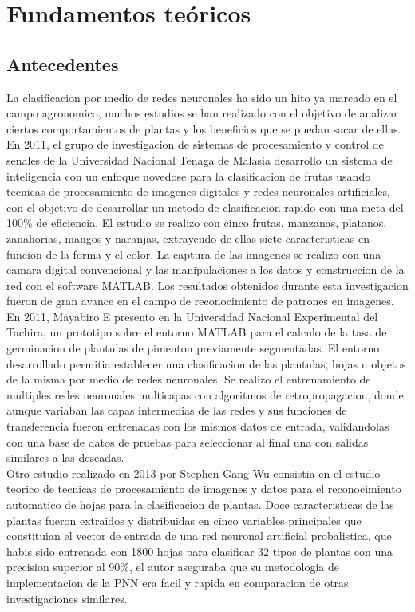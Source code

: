 \chapter{Fundamentos te\'oricos}

\section{Antecedentes}

La clasificacion por medio de redes neuronales ha sido un hito ya marcado en el campo agronomico, muchos estudios se han realizado con el objetivo de analizar ciertos comportamientos de plantas y los beneficios que se puedan sacar de ellas. En 2011, el grupo de investigacion de sistemas de procesamiento y control de senales de la Universidad Nacional Tenaga de Malasia desarrollo un sistema de inteligencia con un enfoque novedose para la clasificacion de frutas usando tecnicas de procesamiento de imagenes digitales y redes neuronales artificiales, con el objetivo de desarrollar un metodo de clasificacion rapido con una meta del 100\% de eficiencia. El estudio se realizo con cinco frutas, manzanas, platanos, zanahorias, mangos y naranjas, extrayendo de ellas siete caracteristicas en funcion de la forma y el color. La captura de las imagenes se realizo con una camara digital convencional y las manipulaciones a los datos y construccion de la red con el software MATLAB. Los resultados obtenidos durante esta investigacion fueron de gran avance en el campo de reconocimiento de patrones en imagenes.\\

En 2011, Mayabiro E presento en la Universidad Nacional Experimental del Tachira, un prototipo sobre el entorno MATLAB para el calculo de la tasa de germinacion de plantulas de pimenton previamente segmentadas. El entorno desarrollado permitia establecer una clasificacion de las plantulas, hojas u objetos de la misma por medio de redes neuronales. Se realizo el entrenamiento de multiples redes neuronales multicapas con algoritmos de retropropagacion, donde aunque variaban las capas intermedias de las redes y sus funciones de transferencia fueron entrenadas con los mismos  datos de entrada, validandolas con una base de datos de pruebas para seleccionar al final una con salidas similares a las deseadas.\\

Otro estudio realizado en 2013 por Stephen Gang Wu consistia en el estudio teorico de tecnicas de procesamiento de imagenes y datos para el reconocimiento automatico de hojas para la clasificacion de plantas. Doce caracteristicas de las plantas fueron extraidos y distribuidas en cinco variables principales que constituian el vector de entrada de una red neuronal artificial probalistica, que habis sido entrenada con 1800 hojas para clasificar 32 tipos de plantas con una precision superior al 90\%, el autor aseguraba que su metodologia de implementacion de la PNN era facil y rapida en comparacion de otras investigaciones similares.\\

